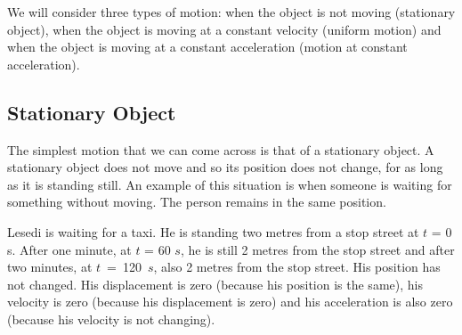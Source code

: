 We will consider three types of motion: when the object is not moving (stationary object), when the object is moving at a constant velocity (uniform motion) and when the object is moving at a constant acceleration (motion at constant acceleration).

\subsection{Stationary Object}
The simplest motion that we can come across is that of a stationary object. A stationary object does not move and so its position does not change, for as long as it is standing still.
An example of this situation is when someone is waiting for something without moving. 
The person remains in the same position. 

Lesedi is waiting for a taxi. He is standing two metres from a stop street at $t$ = 0 s. After one minute, at $t$ = 60 $s$, he is still 2 metres from the stop street and after two minutes, at $t$~=~120~$s$, also 2 metres from the stop street. His position has not changed. His displacement is zero (because his position is the same), his velocity is zero (because his displacement is zero) and his acceleration is also zero (because his velocity is not changing).

